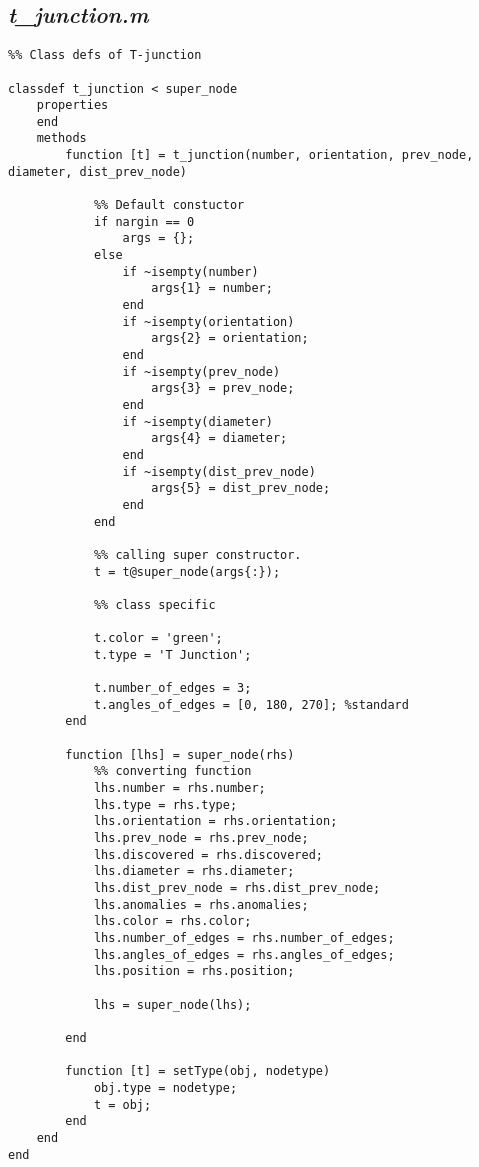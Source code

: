 \subsection{\emph{t\_junction.m}}

\begin{lstlisting}
%% Class defs of T-junction
 
classdef t_junction < super_node
    properties    
    end
    methods
        function [t] = t_junction(number, orientation, prev_node, diameter, dist_prev_node)
            
            %% Default constuctor
            if nargin == 0
                args = {};
            else
                if ~isempty(number)
                    args{1} = number;
                end
                if ~isempty(orientation)
                    args{2} = orientation;
                end
                if ~isempty(prev_node)
                    args{3} = prev_node;
                end
                if ~isempty(diameter)
                    args{4} = diameter;
                end
                if ~isempty(dist_prev_node)
                    args{5} = dist_prev_node;
                end
            end
            
            %% calling super constructor.
            t = t@super_node(args{:});
            
            %% class specific
            
            t.color = 'green';
            t.type = 'T Junction';
            
            t.number_of_edges = 3;
            t.angles_of_edges = [0, 180, 270]; %standard  
        end
        
        function [lhs] = super_node(rhs)
            %% converting function
            lhs.number = rhs.number;
            lhs.type = rhs.type;
            lhs.orientation = rhs.orientation;
            lhs.prev_node = rhs.prev_node;
            lhs.discovered = rhs.discovered;
            lhs.diameter = rhs.diameter;
            lhs.dist_prev_node = rhs.dist_prev_node;
            lhs.anomalies = rhs.anomalies;
            lhs.color = rhs.color;
            lhs.number_of_edges = rhs.number_of_edges;
            lhs.angles_of_edges = rhs.angles_of_edges;
            lhs.position = rhs.position;
            
            lhs = super_node(lhs);
            
        end
        
        function [t] = setType(obj, nodetype)
            obj.type = nodetype;
            t = obj;
        end
    end
end
\end{lstlisting}

